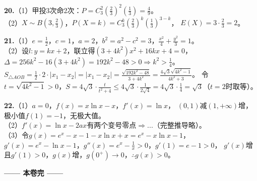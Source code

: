 \documentclass[12pt,a4paper]{ctexart}
\begin{document}
\textbf{20.}（1）甲投3次命2次：$P=C_3^2(\frac23)^2(\frac13)=\frac49$。\\
（2）$X\sim B(3,\frac23)$，$P(X=k)=C_3^k(\frac23)^k(\frac13)^{3-k}$，
$E(X)=3\cdot\frac23=2$。

\textbf{21.}（1）$e=\frac12$，$c=1$，$a=2$，$b^2=a^2-c^2=3$，$\frac{x^2}{4}+\frac{y^2}{3}=1$。\\
（2）设$l:y=kx+2$，联立得$(3+4k^2)x^2+16kx+4=0$，
$\Delta=256k^2-16(3+4k^2)=192k^2-48>0\Rightarrow k^2>\frac14$。
$S_{\triangle AOB}=\frac12\cdot2\cdot|x_1-x_2|=|x_1-x_2|=\frac{\sqrt{192k^2-48}}{3+4k^2}=\frac{4\sqrt3\sqrt{4k^2-1}}{4k^2+3}$。
令$t=\sqrt{4k^2-1}>0$，$S=4\sqrt3\cdot\frac{t}{t^2+4}\le4\sqrt3\cdot\frac1{2\sqrt4}=4\sqrt3\cdot\frac14=\sqrt3$（$t=2$时取等）。

\textbf{22.}（1）$a=0$，$f(x)=x\ln x-x$，$f'(x)=\ln x$，
$(0,1)$减$(1,+\infty)$增，极小值$f(1)=-1$，无极大值。\\
（2）$f'(x)=\ln x-2ax$有两个变号零点$\Rightarrow$...（完整推导略）。\\
（3）令$g(x)=e^x-x-1-x\ln x+x=e^x-x\ln x-1$，
$g'(x)=e^x-\ln x-1$，$g''(x)=e^x-\frac1x>0$，$g'(1)=e-1>0$，
$g'(x)$增且$g'(1)>0$，$g(x)$增，$g(0^+)\to0$，$\therefore g(x)>0$。

\vfill
\centerline{\textbf{—— 本卷完 ——}}
\end{document}
